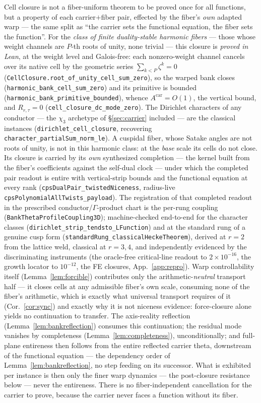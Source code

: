 \documentclass[11pt]{article}
\theoremstyle{definition}
\begin{document}
\noindent Cell closure is not a fiber-uniform theorem to be proved once for all functions, but a property
of each carrier$+$fiber pair, effected by the fiber's \emph{own} adapted warp --- the same split as ``the
carrier sets the functional equation, the fiber sets the function''. For the \emph{class of finite
duality-stable harmonic fibers} --- those whose weight channels are $P$-th roots of unity, none trivial ---
this closure is \emph{proved in Lean}, at the weight level and Galois-free: each nonzero-weight channel
cancels over its native cell by the geometric series $\sum_{k<P}\zeta^k=0$
(\texttt{CellClosure.root\_of\_unity\_cell\_sum\_zero}), so the warped bank closes
(\texttt{harmonic\_bank\_cell\_sum\_zero}) and its primitive is bounded
(\texttt{harmonic\_bank\_primitive\_bounded}), whence $A^{\mathrm{car}}=O(1)$, the vertical bound, and
$R_{r,\tau}=0$ (\texttt{cell\_closure\_dc\_mode\_zero}). The Dirichlet characters of any conductor ---
the $\chi_3$ archetype of \S\ref{sec:carrier} included --- are the classical instances
(\texttt{dirichlet\_cell\_closure}, recovering \texttt{character\_partialSum\_norm\_le}). A cuspidal fiber,
whose Satake angles are not roots of unity, is not in this harmonic class: at the \emph{base} scale its
cells do not close.  Its closure is carried by its \emph{own} synthesized completion --- the kernel built
from the fiber's coefficients against the self-dual clock --- under which the completed pair readout is
entire with vertical-strip bounds and the functional equation at every rank
(\texttt{cpsDualPair\_twistedNiceness}, radius-live \texttt{cpsPolynomialAllTwists\_payload}).  The
registration of that completed readout in the prescribed conductor/$\Gamma$-product chart is the per-rung
coupling (\texttt{BankThetaProfileCoupling3D}); machine-checked end-to-end for the character classes
(\texttt{dirichlet\_strip\_tendsto\_LFunction}) and at the standard rung of a genuine cusp form
(\texttt{standardRung\_classicalHeckeTheorem}), derived at $r=2$ from the lattice weld, classical at
$r=3,4$, and independently evidenced by the discriminating instruments (the oracle-free critical-line
readout to $2\times10^{-16}$, the growth locator to $10^{-12}$, the FE closures, App.~\ref{app:repro}). Warp controllability itself (Lemma~\ref{lem:forcible}) contributes only the
arithmetic-\emph{neutral} transport half --- it closes cells at any admissible fiber's own scale, consuming
none of the fiber's arithmetic, which is exactly what universal transport requires of it
(Cor.~\ref{cor:sync}) and exactly why it is not niceness evidence: force-closure alone yields no
continuation to transfer. The axis-reality
reflection (Lemma~\ref{lem:bankreflection}) consumes this continuation; the residual mode vanishes by
completeness (Lemma~\ref{lem:completeness}), unconditionally; and full-plane entireness then follows from the entire
reflected carrier theta, downstream of the functional equation --- the dependency order of
Lemma~\ref{lem:bankreflection}, no step feeding on its successor.
What is exhibited per instance is then only the finer warp dynamics --- the post-closure resistance below ---
never the entireness. There is no fiber-independent cancellation for the carrier to prove, because the
carrier never faces a function without its fiber.
\end{document}
